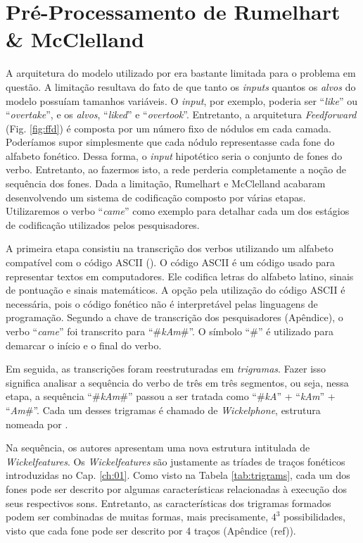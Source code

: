 \section{Pré-Processamento de Rumelhart \& McClelland}
\label{sec:transcr}
A arquitetura do modelo utilizado por \cite{rumelhart:1986} era bastante limitada para o problema em questão. A limitação resultava do fato de que tanto os \textit{inputs} quantos os \textit{alvos} do modelo possuíam tamanhos variáveis. O \textit{input}, por exemplo, poderia ser “\textit{like}” ou “\textit{overtake}”, e os \textit{alvos}, “\textit{liked}” e “\textit{overtook}”. Entretanto, a arquitetura \textit{Feedforward} (Fig. \ref{fig:ffd}) é composta por um número fixo de nódulos em cada camada. Poderíamos supor simplesmente que cada nódulo representasse cada fone do alfabeto fonético. Dessa forma, o \textit{input} hipotético seria o conjunto de fones do verbo. Entretanto, ao fazermos isto, a rede perderia completamente a noção de sequência dos fones. Dada a limitação, Rumelhart e McClelland acabaram desenvolvendo um sistema de codificação composto por várias etapas. Utilizaremos o verbo “\textit{came}” como exemplo para detalhar cada um dos estágios de codificação utilizados pelos pesquisadores.

A primeira etapa consistiu na transcrição dos verbos utilizando um alfabeto compatível com o código ASCII (\cite{mackenzie1980coded}). O código ASCII é um código 
usado para representar textos em computadores. Ele codifica letras do alfabeto latino, sinais de pontuação e sinais matemáticos. A opção pela utilização do código ASCII é necessária, pois o código fonético não é interpretável pelas linguagens de programação. Segundo a chave de transcrição dos pesquisadores (Apêndice), o verbo “\textit{came}” foi transcrito para “\#\textit{kAm}\#”. O símbolo “\#” é utilizado para demarcar o início e o final do verbo. 

Em seguida, as transcrições foram reestruturadas em \textit{trigramas}. Fazer isso significa analisar a sequência do verbo de três em três segmentos, ou seja, nessa etapa, a sequência “\#\textit{kAm}\#” passou a ser tratada como “\#\textit{kA}” + “\textit{kAm}” + “\textit{Am}\#”. Cada um desses trigramas é chamado de \textit{Wickelphone}, estrutura nomeada por \cite{wickelgren:1969}.

Na sequência, os autores apresentam uma nova estrutura intitulada de \textit{Wickelfeatures}. Os \textit{Wickelfeatures} são justamente as tríades de traços fonéticos introduzidas no Cap. \ref{ch:01}. Como visto na Tabela \ref{tab:trigrams}, cada um dos fones pode ser descrito por algumas características relacionadas à execução dos seus respectivos sons. Entretanto, as características dos trigramas formados podem ser combinadas de muitas formas, mais precisamente, $4^{3}$ possibilidades, visto que cada fone pode ser descrito por 4 traços (Apêndice (ref)). 

